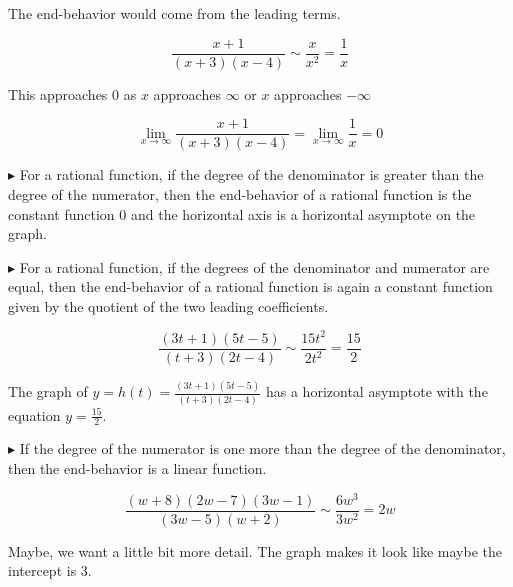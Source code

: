 \documentclass{ximera}
\begin{document}
The end-behavior would come from the leading terms.


\[ \frac{x+1}{(x+3)(x-4)}    \sim    \frac{x}{x^2} = \frac{1}{x}  \]


This approaches $0$ as $x$ approaches $\infty$ or $x$ approaches $-\infty$ 



\[
\lim\limits_{x \to \infty} \frac{x+1}{(x+3)(x-4)} = \lim\limits_{x \to \infty} \frac{1}{x} = 0
\]









$\blacktriangleright$   For a rational function, if the degree of the denominator is greater than the degree of the numerator, then the end-behavior of a rational function is the constant function $0$ and the horizontal axis is a horizontal asymptote on the graph.




$\blacktriangleright$   For a rational function, if the degrees of the denominator and numerator are equal, then the end-behavior of a rational function is again a constant function given by the quotient of the two leading coefficients.


\[ \frac{(3t+1)(5t-5)}{(t+3)(2t-4)}    \sim    \frac{15t^2}{2t^2} = \frac{15}{2}  \]




The graph of $y = h(t) = \frac{(3t+1)(5t-5)}{(t+3)(2t-4)} $ has a horizontal asymptote with the equation $y = \frac{15}{2}$.




$\blacktriangleright$   If the degree of the numerator is one more than the degree of the denominator, then the end-behavior is a linear function.


\[ \frac{(w+8)(2w-7)(3w-1)}{(3w-5)(w+2)}    \sim   \frac{6w^3}{3w^2} = 2w \]








\begin{center}
\end{center}




Maybe, we want a little bit more detail. The graph makes it look like maybe the intercept is $3$.
\end{document}
